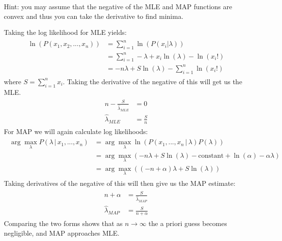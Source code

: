 \begin{Parts}
    Hint: you may assume that the negative of the MLE and MAP functions are convex and thus you can take the derivative to find minima.

\begin{solution}
    Taking the log likelihood for MLE yields:
    \begin{align*}
        \begin{aligned}
            \ln(P(x_1, x_2, ..., x_n)) &= \sum_{i=1}^n \ln(P(x_i|\lambda))\\
            &= \sum_{i=1}^n -\lambda+x_i \ln(\lambda) - \ln(x_i!)\\
            &= -n\lambda + S \ln(\lambda) - \sum_{i=1}^n \ln(x_i!)
        \end{aligned}
    \end{align*}
    where $S=\sum_{i=1}^n x_i$. Taking the derivative of the negative of this will get us the MLE.
    \begin{align*}
        \begin{aligned}
            n-\frac{S}{\hat{\lambda}_{MLE}} &= 0\\
            \hat{\lambda}_{MLE} &= \frac{S}{n}
        \end{aligned}
    \end{align*}
    For MAP we will again calculate log likelihoods:
    \begin{align*}
        \begin{aligned}
            \arg\max_\lambda P(\lambda\,|\,x_1, ..., x_n) &= \arg\max_\lambda \ln(P(x_1, ..., x_n\,|\,\lambda)P(\lambda))\\
            &= \arg\max_\lambda (-n\lambda + S \ln(\lambda)-\text{constant}+\ln(\alpha)-\alpha\lambda)\\
            &= \arg\max_\lambda ((-n+\alpha)\lambda + S \ln(\lambda))
        \end{aligned}
    \end{align*}
    Taking derivatives of the negative of this will then give us the MAP estimate:
    \begin{align*}
        \begin{aligned}
            n+\alpha &= \frac{S}{\hat{\lambda}_{MAP}}\\
            \hat{\lambda}_{MAP} &= \frac{S}{n+\alpha}
        \end{aligned}
    \end{align*}
    Comparing the two forms shows that as $n \to \infty$ the a priori guess becomes negligible, and MAP approaches MLE.
\end{solution}

\end{Parts}
